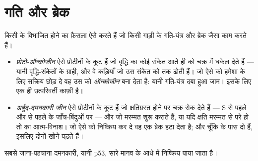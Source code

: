 \section{गति और ब्रेक}

\begin{proposition}\label{prop:g11:cancer:genes}
किसी  के विभाजित होने का फ़ैसला ऐसे  करते हैं जो किसी गाड़ी के
गति-यंत्र और ब्रेक जैसा काम करते हैं।
\begin{itemize}
  \item \emph{प्रोटो-ऑन्कोजीन} ऐसे प्रोटीनों के
        कूट हैं जो वृद्धि का कोई संकेत आते ही  को चक्र में धकेल देते
        हैं --- यानी वृद्धि-संकेतों के ग्राही, और वे कड़ियाँ जो उस संकेत
        को  तक ढोती हैं। जो  ऐसे  को हमेशा के लिए
        सक्रिय छोड़ दे वह उस  को \emph{ऑन्कोजीन} बना देता है: यानी
        गति-यंत्र दबा हुआ जाम। इसके लिए एक ही उत्परिवर्ती  काफ़ी है।
  \item \emph{अर्बुद-दमनकारी जीन} ऐसे प्रोटीनों
        के कूट हैं जो  क्षतिग्रस्त होने पर चक्र रोक देते हैं ---
        S से पहले और  से पहले के जाँच-बिंदुओं पर --- और जो
        मरम्मत शुरू कराते हैं, या यदि क्षति मरम्मत से परे हो तो  का
        आत्म-विनाश। जो  ऐसे  को निष्क्रिय कर दे वह एक
        ब्रेक हटा देता है; और चूँकि  के पास दो  हैं, इसलिए
        दोनों खोने पड़ते हैं।
\end{itemize}
सबसे जाना-पहचाना दमनकारी, यानी  p53, सारे मानव  के आधे में
निष्क्रिय पाया जाता है।
\end{proposition}
\admitted


